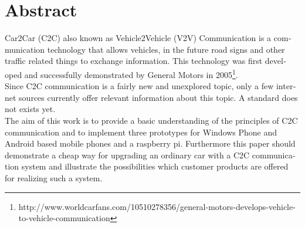 \chapter{Abstract}
\begin{english} 
Car2Car (C2C) also known as Vehicle2Vehicle (V2V) Communication is a communication technology that allows vehicles, in the future road signs and other traffic related things to exchange information. This technology was first developed and successfully demonstrated by General Motors in 2005\footnote{http://www.worldcarfans.com/10510278356/general-motors-develops-vehicle-to-vehicle-communication}.
\\
Since C2C communication is a fairly new and unexplored topic, only a few internet sources currently offer relevant information about this topic. A standard does not exists yet.\\
The aim of this work is to provide a basic understanding of the principles of C2C communication and to implement three prototypes for Windows Phone and Android based mobile phones and a raspberry pi. Furthermore this paper should demonstrate a cheap way for upgrading an ordinary car with a C2C communication system and illustrate the possibilities which customer products are offered for realizing such a system.

\end{english}
